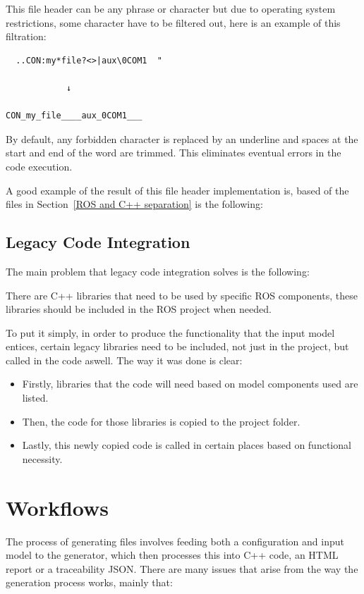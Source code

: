 This file header can be any phrase or character but due to operating system restrictions, some character have to be filtered out, here is an example of this filtration:

\begin{verbatim}
  ..CON:my*file?<>|aux\0COM1  "

			↓

CON_my_file____aux_0COM1___
\end{verbatim}

By default, any forbidden character is replaced by an underline and spaces at the start and end of the word are trimmed. This eliminates eventual errors in the code execution.

A good example of the result of this file header implementation is, based of the files in Section~\ref{ROS and C++ separation} is the following:

\subsection{Legacy Code Integration}
\label{sec:impl_legacy_code}

The main problem that legacy code integration solves is the following:

There are C++ libraries that need to be used by specific \gls{ROS} components, these libraries should be included in the \gls{ROS} project when needed.

To put it simply, in order to produce the functionality that the input model entices, certain legacy libraries need to be included, not just in the project, but called in the code aswell. The way it was done is clear:

\begin{itemize} 
	\item Firstly, libraries that the code will need based on model components used are listed.
	\item Then, the code for those libraries is copied to the project folder.
	\item Lastly, this newly copied code is called in certain places based on functional necessity.
\end{itemize}


\section{Workflows}
\label{sec:workflows}

The process of generating files involves feeding both a configuration and input model to the generator, which then processes this into C++ code, an \gls{HTML} report or a traceability \gls{JSON}. There are many issues that arise from the way the generation process works, mainly that:

